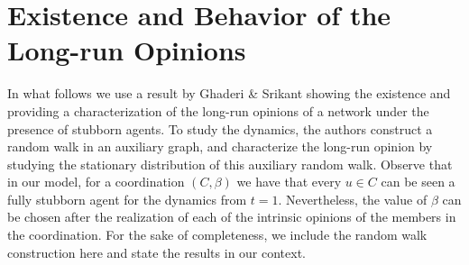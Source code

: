 \documentclass[letterpaper,11pt]{article}
\newcommand{\cost}{\mathsf{cost}}
\newtheorem{lemma}{Lemma}
\newcommand{\vvcom}[1]{\todo[color=red!25!white]{Victor: #1}}
\begin{document}


\begin{comment}
\noindent{\it Sustainability.} Every node $u\in V$ faces a discount factor of $\delta\in (0,1)$, representing the {\color{red} dar la intuicion aca.}
We say that a triplet $(C,\beta,\gamma_0)$ is a {\it sustainable coordination} if for every $u\in C$ we have that
\begin{equation}
\sum_{t=1}^{\infty}\delta^{t}\cost_u(\gamma_{t})\le \sum_{t=1}^{\infty}\delta^{t}\cost_u(\tilde \gamma_{t}),
\end{equation}
where $\tilde \gamma$ is the coordination dynamics for $(C\setminus \{u\},\beta)$.
That is, the expected discounted cost that faces a node $u\in C$ is less than the expected discounted cost faced by not joining the coordination.
\end{comment}

\section{Existence and Behavior of the Long-run Opinions}

In what follows we use a result by Ghaderi \& Srikant showing the existence and providing a characterization of the long-run opinions of a network under the presence of stubborn agents. 
To study the dynamics, the authors construct a random walk in an auxiliary graph, and characterize the long-run opinion by studying the stationary distribution of this auxiliary random walk.
Observe that in our model, for a coordination $(C,\beta)$ we have that every $u\in C$ can be seen a fully stubborn agent for the dynamics from $t=1$.
Nevertheless, the value of $\beta$ can be chosen after the realization of each of the intrinsic opinions of the members in the coordination.
For the sake of completeness, we include the random walk construction here and state the results in our context.\\
\end{document}
